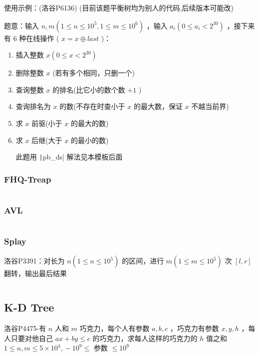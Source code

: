 \documentclass[twocolumn,10pt]{ctexart}
\begin{document}
使用示例：(洛谷P6136) (目前该题平衡树均为别人的代码,后续版本可能改)

\begin{notebox}
题意：输入 $n,\allowbreak{}m(1\le n\le10^5,\allowbreak{}1\le m\le10^6)$ ，输入 $a_i(0\le a_i < 2^{30})$ ，接下来有 $6$ 种在线操作 ( $x=x\oplus last$ )：

\begin{enumerate}
\item 插入整数 $x(0\le x < 2^{30})$
\item 删除整数 $x$ (若有多个相同，只删一个)
\item 查询整数 $x$ 的排名(比它小的数个数 $+1$ )
\item 查询排名为 $x$ 的数(不存在时查小于 $x$ 的最大数，保证 $x$ 不越当前界)
\item 求 $x$ 前驱(小于 $x$ 的最大的数)
\item 求 $x$ 后继(大于 $x$ 的最小的数)

此题用 \texttt|pb_ds| 解法见本模板后面
\end{enumerate}
\end{notebox}

\subsubsection{FHQ-Treap}

\inputminted{cpp}{code/p6136_fhq_treap.cpp}

\subsubsection{AVL}

\inputminted{cpp}{code/ext_024.cpp}

\subsubsection{Splay}

\begin{notebox}
洛谷P3391：对长为 $n(1\le n\le10^5)$ 的区间，进行 $m(1\le m\le10^5)$ 次 $[l,r]$ 翻转，输出最后结果
\end{notebox}

\inputminted{cpp}{code/p3391_splay.cpp}

\subsection{K-D Tree}

\begin{notebox}
洛谷P4475-有 $n$ 人和 $m$ 巧克力，每个人有参数 $a,b,c$ ，巧克力有参数 $x,y,h$ ，每人只要对他自己 $ax+by\le c$ 的巧克力，求每人这样的巧克力的 $h$ 值之和 $1\le n,\allowbreak{}m\le5\times10^4,\allowbreak{}-10^9\le$ 参数 $\le10^9$
\end{notebox}
\end{document}
